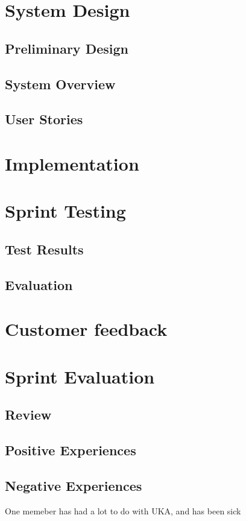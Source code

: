 \documentclass{report}
\begin{document}
\section{System Design} \label{sec:system_design2}
\subsection{Preliminary Design} \label{subsec:prelim_design2}
\subsection{System Overview} \label{subsec:sys_overview2}
\subsection{User Stories} \label{subsec:user_stories2}
\newpage
\section{Implementation} \label{sec:implementation2}
\newpage
\section{Sprint Testing} \label{sec:sprint_testing2}
\subsection{Test Results} \label{subsec:test_results2}
\subsection{Evaluation} \label{subsec:evaluation2}
\newpage
\section{Customer feedback} \label{sec:cust_feed2}
\newpage
\section{Sprint Evaluation} \label{sec:sprint_eva2}
\subsection{Review} \label{subsec:review2}
\subsection{Positive Experiences} \label{subsec:pos_exp2}
\subsection{Negative Experiences} \label{subsec:neg_exp2}
One memeber has had a lot to do with UKA, and has been sick
\end{document}
